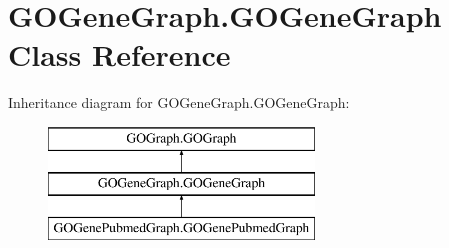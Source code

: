 \hypertarget{class_g_o_gene_graph_1_1_g_o_gene_graph}{
\section{GOGeneGraph.GOGeneGraph Class Reference}
\label{class_g_o_gene_graph_1_1_g_o_gene_graph}
}
Inheritance diagram for GOGeneGraph.GOGeneGraph:\begin{figure}[H]
\begin{center}
\leavevmode
\includegraphics[height=3.000000cm]{class_g_o_gene_graph_1_1_g_o_gene_graph}
\end{center}
\end{figure}
